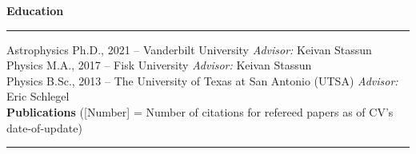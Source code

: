 \documentclass[letter,11pt]{article}
\begin{document}
\bigskip

\noindent
{\bf Education} \\
\vspace{-10mm}
\begin{center}
\rule{\textwidth}{0.2mm}
\end{center}
\vspace{-3mm}
\noindent
Astrophysics Ph.D., 2021 -- Vanderbilt University \hfill \textit{Advisor:} Keivan Stassun \\
Physics M.A., 2017 -- Fisk University \hfill \enspace \qquad \textit{Advisor:} Keivan Stassun \\
Physics B.Sc., 2013 -- The University of Texas at San Antonio (UTSA) \hfill \textit{Advisor:} Eric Schlegel \\

\noindent
{\bf Publications} ([Number] = Number of citations for refereed papers as of CV's date-of-update) \\
\vspace{-10mm}
\begin{center}
\rule{\textwidth}{0.2mm}
\end{center}
\vspace{-3mm}
\noindent
\end{document}
